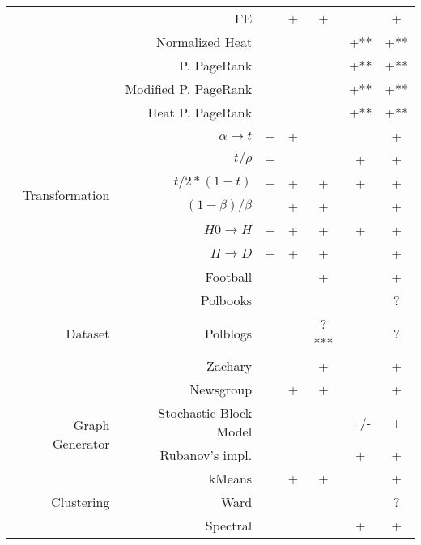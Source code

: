 \documentclass{article}
\begin{document}
\begin{table}[H]
\begin{tabular}{rr|cccc|c}
                & FE                       &            & +        & +      &             & +      \\
                & Normalized Heat          &            &          &        & +**         & \cellcolor{yellow!25} +** \\
                & P. PageRank              &            &          &        & +**         & \cellcolor{yellow!25} +** \\
                & Modified P. PageRank     &            &          &        & +**         & \cellcolor{yellow!25} +** \\
                & Heat P. PageRank         &            &          &        & +**         & \cellcolor{yellow!25} +** \\
                \hline
\multirow{6}{*}{Transformation} & $\alpha \rightarrow t$ & + & +   &        &             & +      \\
                & $t / \rho$               & +          &          &        & +           & +      \\
                & $t / 2*(1 - t)$          & +          & +        & +      & +           & +      \\
                & $(1 - \beta) / \beta$    &            & +        & +      &             & +      \\
                & $H0 \rightarrow H$       & +          & +        & +      & +           & +      \\
                & $H \rightarrow D$        & +          & +        & +      &             & +      \\
                \hline
\multirow{5}{*}{Dataset} & Football        &            &          & +      &             & +      \\
                & Polbooks                 &            &          &        &             & \cellcolor{yellow!25} ? \\
                & Polblogs                 &            &          & ?***   &             & \cellcolor{yellow!25} ? \\
                & Zachary                  &            &          & +      &             & +      \\
                & Newsgroup                &            & +        & +      &             & +      \\
                \hline
\multirow{2}{*}{Graph Generator} & Stochastic Block Model &  &     &        & \cellcolor{yellow!25} +/- & \cellcolor{yellow!25} + \\
                & Rubanov's impl.          &            &          &        & +           & +      \\
                \hline
\multirow{3}{*}{Clustering} & kMeans       &            & +        & +      &             & +      \\
                & Ward                     &            &          &        &             & \cellcolor{yellow!25} ? \\
                & Spectral                 &            &          &        & +           & +
\end{tabular}
\end{table}
\end{document}
